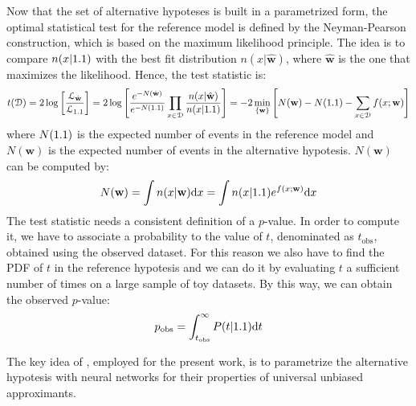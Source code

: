 Now that the set of alternative hypoteses is built in a parametrized form, the optimal statistical test for the reference model is defined by the Neyman-Pearson construction, which is based on the maximum likelihood principle\footnotemark. The idea is to compare $n(x|1.1)$ with the best fit distribution $n(x|\hat{\mathbf{w}})$, where $\hat{\mathbf{w}}$ is the one that maximizes the likelihood. Hence, the test statistic is:
\begin{equation}
	\label{eqn:T}
	t(\mathcal{D})
	=
	2 \log{\left[
	\frac{\mathcal{L}_{\hat{\mathbf{w}}}}{\mathcal{L}_{1.1}}
	\right]}
	= 
	2 \log{\left[
	\frac{e^{-N(\hat{\mathbf{w}})}}{e^{-N(1.1)}} \prod_{x \in \mathcal{D}} \frac{n(x|\hat{\mathbf{w}})}{n(x|1.1)}
	\right]}
	=
	-2 \min_{\{\mathbf{w}\}}{\left[
	N(\mathbf{w}) - N(1.1) - \sum_{x \in \mathcal{D}} f(x;\mathbf{w})
	\right]}
\end{equation}
where $N(1.1)$ is the expected number of events in the reference model and $N(\mathbf{w})$ is the expected number of events in the alternative hypotesis. $N(\mathbf{w})$ can be computed by:
\begin{equation}
	N(\mathbf{w}) = \int n(x|\mathbf{w}) \mathrm{d} x = \int n(x|1.1) e^{f(x;\mathbf{w})} \mathrm{d} x
\end{equation}
The test statistic needs a consistent definition of a $p$-value. In order to compute it, we have to associate a probability to the value of $t$, denominated as $t_\mathrm{obs}$, obtained using the observed dataset. For this reason we also have to find the PDF of $t$ in the reference hypotesis and we can do it by evaluating $t$ a sufficient number of times on a large sample of toy datasets. By this way, we can obtain the observed $p$-value:
\begin{equation}
	p_\mathrm{obs} = \int_{t_\mathrm{obs}}^{\infty} P(t|1.1) \mathrm{d} t
\end{equation}

The key idea of \cite{wulzer}, employed for the present work, is to parametrize the alternative hypotesis with neural networks for their properties of universal unbiased approximants.


